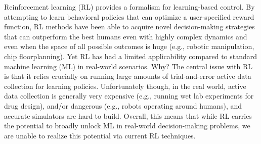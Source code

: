 

Reinforcement learning (RL) provides a formalism for learning-based control. By attempting to learn behavioral policies that can optimize a user-specified reward function, RL methods have been able to acquire novel decision-making strategies that can outperform the best humans even with highly complex dynamics and even when the space of all possible outcomes is huge (e.g., robotic manipulation, chip floorplanning). Yet RL has had a limited applicability compared to standard machine learning (ML) in real-world scenarios. Why? The central issue with RL is that it relies crucially on running large amounts of trial-and-error active data collection for learning policies. Unfortunately though, in the real world, active data collection is generally very expensive (e.g., running wet lab experiments for drug design), and/or dangerous (e.g., robots operating around humans), and accurate simulators are hard to build. Overall, this means that while RL carries the potential to broadly unlock ML in real-world decision-making problems, we are unable to realize this potential via current RL techniques.           

